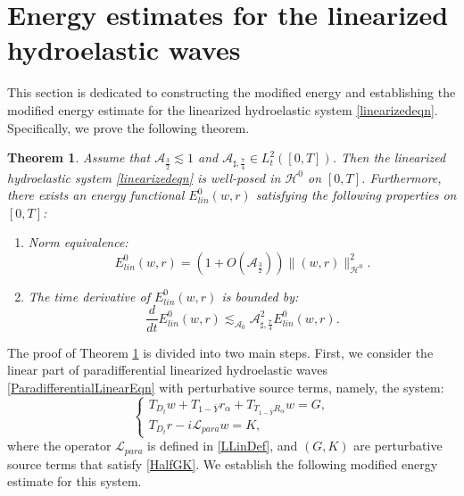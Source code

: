 \documentclass[10pt]{amsart}
\newtheorem{theorem}{Theorem}[section]
\theoremstyle{remark}
\theoremstyle{definition}
\numberwithin{equation}{section}
\renewcommand{\H}{{\mathcal H }}
\newcommand{\al}{\alpha}
\newcommand{\f}{\frac}
\newcommand{\CalAZ}{{\mathcal{A}_0}}
\newcommand{\ASSharp}{{\mathcal{A}_{\sharp,\frac{7}{4}}^2}}
\begin{document}
\section{Energy estimates for the linearized hydroelastic waves} \label{s:EstLin}
This section is dedicated to constructing the modified energy and establishing the modified energy estimate for the linearized hydroelastic system \eqref{linearizedeqn}. 
Specifically, we prove the following theorem.
\begin{theorem} \label{t:LinearizedWellposed}
Assume that $\mathcal{A}_\f32 \lesssim 1$ and $\mathcal{A}_{\sharp, \f74} \in L^2_t([0,T])$.
Then the linearized hydroelastic system \eqref{linearizedeqn} is well-posed in $\H^0$ on $[0,T]$.
Furthermore, there exists an energy functional $E^{0}_{lin}(w,r)$ satisfying the following properties on $[0,T]$:
\begin{enumerate}
    \item Norm equivalence:
    \begin{equation*}
        E^{0}_{lin}(w,r) = \left(1+O\left(\mathcal{A}_\f32 \right) \right) \| (w,r)\|^2_{\H^{0}}.
    \end{equation*}
    \item The time derivative of $E_{lin}^{0}(w,r)$ is bounded by:
    \begin{equation*}
        \frac{d}{dt} E_{lin}^{0}(w,r) \lesssim_{\CalAZ}  \ASSharp E^{0}_{lin}(w,r).
    \end{equation*}
\end{enumerate} 
\end{theorem}
The proof of Theorem \ref{t:LinearizedWellposed} is divided into two main steps.
First, we consider the linear part of paradifferential linearized hydroelastic waves \eqref{ParadifferentialLinearEqn} with perturbative source terms, namely, the system: 
\begin{equation}  \label{ParadifferentialFlow}
\begin{cases}
T_{D_t}w+T_{1-\bar{Y}}r_{\al}+T_{T_{1-\bar{Y}}R_{\al}}w=G,\\
T_{D_t}r-i\mathcal{L}_{para}w=K,
\end{cases}
\end{equation}
where the operator $\mathcal{L}_{para}$ is defined in \eqref{LLinDef}, and $(G,K)$ are perturbative source terms that satisfy \eqref{HalfGK}.
We establish the following modified energy estimate for this system.
\end{document}
